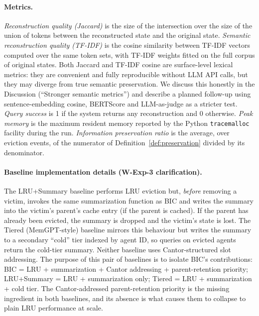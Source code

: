 \documentclass[fleqn,10pt]{article}
\theoremstyle{definition}
\begin{document}
\paragraph{Metrics.}
\emph{Reconstruction quality (Jaccard)} is the size of the
intersection over the size of the union of tokens between the
reconstructed state and the original state. \emph{Semantic
reconstruction quality (TF-IDF)} is the cosine similarity between
TF-IDF vectors computed over the same token sets, with TF-IDF weights
fitted on the full corpus of original states. Both Jaccard and
TF-IDF cosine are surface-level lexical metrics: they are convenient
and fully reproducible without LLM API calls, but they may diverge
from true semantic preservation. We discuss this honestly in the
Discussion (``Stronger semantic metrics'') and describe a planned
follow-up using sentence-embedding cosine, BERTScore and
LLM-as-judge as a stricter test. \emph{Query success}
is 1 if the system returns any reconstruction and 0 otherwise.
\emph{Peak memory} is the maximum resident memory reported by the
Python \texttt{tracemalloc} facility during the run.
\emph{Information preservation ratio} is the average, over eviction
events, of the numerator of Definition~\ref{def:preservation}
divided by its denominator.

\paragraph{Baseline implementation details (W-Exp-3 clarification).}
The LRU+Summary baseline performs LRU eviction but, \emph{before}
removing a victim, invokes the same summarization function as BIC
and writes the summary into the victim's parent's cache entry (if
the parent is cached). If the parent has already been evicted, the
summary is dropped and the victim's state is lost. The Tiered
(MemGPT-style) baseline mirrors this behaviour but writes the
summary to a secondary ``cold'' tier indexed by agent ID, so
queries on evicted agents return the cold-tier summary. Neither
baseline uses Cantor-structured slot addressing. The purpose of this
pair of baselines is to isolate BIC's contributions: BIC = LRU +
summarization + Cantor addressing + parent-retention priority;
LRU+Summary = LRU + summarization only; Tiered = LRU + summarization
+ cold tier. The Cantor-addressed parent-retention priority is the
missing ingredient in both baselines, and its absence is what causes
them to collapse to plain LRU performance at scale.
\end{document}
